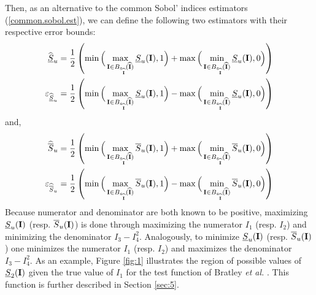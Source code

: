 Then, as an alternative to the common Sobol' indices estimators (\ref{common.sobol.est}), we can define the following two estimators with their respective error bounds:
\begin{gather}
\begin{aligned}
\widehat{\underline{S}}_u & = \frac{1}{2}\left(\min\Big{(}\max_{\boldsymbol{\mathbf{I}}\in B_{\varepsilon_{\widehat{\boldsymbol{\mathbf{I}}}}}(\widehat{\boldsymbol{\mathbf{I}}})} \underline{S}_u(\boldsymbol{\mathbf{I}}),1\Big{)} + \max\Big{(}\min_{\boldsymbol{\mathbf{I}}\in B_{\varepsilon_{\widehat{\boldsymbol{\mathbf{I}}}}}(\widehat{\boldsymbol{\mathbf{I}}})} \underline{S}_u(\boldsymbol{\mathbf{I}}),0\Big{)} \right) \\
\varepsilon_{\widehat{\underline{S}}_u} & = \frac{1}{2}\left(\min\Big{(}\max_{\boldsymbol{\mathbf{I}}\in B_{\varepsilon_{\widehat{\boldsymbol{\mathbf{I}}}}}(\widehat{\boldsymbol{\mathbf{I}}})} \underline{S}_u(\boldsymbol{\mathbf{I}}),1\Big{)} - \max\Big{(}\min_{\boldsymbol{\mathbf{I}}\in B_{\varepsilon_{\widehat{\boldsymbol{\mathbf{I}}}}}(\widehat{\boldsymbol{\mathbf{I}}})} \underline{S}_u(\boldsymbol{\mathbf{I}}),0\Big{)} \right)
\end{aligned}
\label{formula_undersu}
\end{gather}
and,
\begin{gather}
\begin{aligned}
\widehat{\overline{S}}_u & = \frac{1}{2}\left(\min\Big{(}\max_{\boldsymbol{\mathbf{I}}\in B_{\varepsilon_{\widehat{\boldsymbol{\mathbf{I}}}}}(\widehat{\boldsymbol{\mathbf{I}}})} \overline{S}_u(\boldsymbol{\mathbf{I}}),1\Big{)} + \max\Big{(}\min_{\boldsymbol{\mathbf{I}}\in B_{\varepsilon_{\widehat{\boldsymbol{\mathbf{I}}}}}(\widehat{\boldsymbol{\mathbf{I}}})} \overline{S}_u(\boldsymbol{\mathbf{I}}),0\Big{)} \right) \\
\varepsilon_{\widehat{\overline{S}}_u} & = \frac{1}{2}\left(\min\Big{(}\max_{\boldsymbol{\mathbf{I}}\in B_{\varepsilon_{\widehat{\boldsymbol{\mathbf{I}}}}}(\widehat{\boldsymbol{\mathbf{I}}})} \overline{S}_u(\boldsymbol{\mathbf{I}}),1\Big{)} - \max\Big{(}\min_{\boldsymbol{\mathbf{I}}\in B_{\varepsilon_{\widehat{\boldsymbol{\mathbf{I}}}}}(\widehat{\boldsymbol{\mathbf{I}}})} \overline{S}_u(\boldsymbol{\mathbf{I}}),0\Big{)} \right)
\end{aligned}
\label{formula_oversu}
\end{gather}
Because numerator and denominator are both known to be positive, maximizing $\underline{S}_u(\boldsymbol{\mathbf{I}})$ (resp. $\overline{S}_u(\boldsymbol{\mathbf{I}})$) is done through maximizing the numerator $I_1$ (resp. $I_2$) and minimizing the denominator $I_3-I_4^2$. Analogously, to minimize $\underline{S}_u(\boldsymbol{\mathbf{I}})$ (resp. $\overline{S}_u(\boldsymbol{\mathbf{I}})$) one minimizes the numerator $I_1$ (resp. $I_2$) and maximizes the denominator $I_3-I_4^2$. As an example, Figure \ref{fig:1} illustrates the region of possible values of $\underline{S}_2(\boldsymbol{\mathbf{I}})$ given the true value of $I_1$ for the test function of Bratley \textit{et al.} \cite{Bratley}. This function is further described in Section \ref{sec:5}. 
